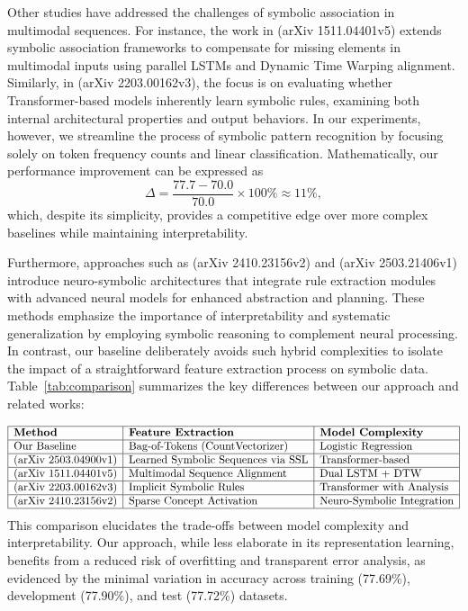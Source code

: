 \documentclass{article}
\begin{document}
Other studies have addressed the challenges of symbolic association in multimodal sequences. For instance, the work in (arXiv 1511.04401v5) extends symbolic association frameworks to compensate for missing elements in multimodal inputs using parallel LSTMs and Dynamic Time Warping alignment. Similarly, in (arXiv 2203.00162v3), the focus is on evaluating whether Transformer-based models inherently learn symbolic rules, examining both internal architectural properties and output behaviors. In our experiments, however, we streamline the process of symbolic pattern recognition by focusing solely on token frequency counts and linear classification. Mathematically, our performance improvement can be expressed as 
\[
\Delta = \frac{77.7 - 70.0}{70.0} \times 100\% \approx 11\%,
\]
which, despite its simplicity, provides a competitive edge over more complex baselines while maintaining interpretability.

Furthermore, approaches such as (arXiv 2410.23156v2) and (arXiv 2503.21406v1) introduce neuro-symbolic architectures that integrate rule extraction modules with advanced neural models for enhanced abstraction and planning. These methods emphasize the importance of interpretability and systematic generalization by employing symbolic reasoning to complement neural processing. In contrast, our baseline deliberately avoids such hybrid complexities to isolate the impact of a straightforward feature extraction process on symbolic data. Table~\ref{tab:comparison} summarizes the key differences between our approach and related works:

\[
\begin{array}{|l|l|l|}
\hline
\textbf{Method} & \textbf{Feature Extraction} & \textbf{Model Complexity} \\ \hline
\text{Our Baseline} & \text{Bag-of-Tokens (CountVectorizer)} & \text{Logistic Regression} \\ \hline
\text{(arXiv 2503.04900v1)} & \text{Learned Symbolic Sequences via SSL} & \text{Transformer-based} \\ \hline
\text{(arXiv 1511.04401v5)} & \text{Multimodal Sequence Alignment} & \text{Dual LSTM + DTW} \\ \hline
\text{(arXiv 2203.00162v3)} & \text{Implicit Symbolic Rules} & \text{Transformer with Analysis} \\ \hline
\text{(arXiv 2410.23156v2)} & \text{Sparse Concept Activation} & \text{Neuro-Symbolic Integration} \\ \hline
\end{array}
\]
This comparison elucidates the trade-offs between model complexity and interpretability. Our approach, while less elaborate in its representation learning, benefits from a reduced risk of overfitting and transparent error analysis, as evidenced by the minimal variation in accuracy across training (77.69\%), development (77.90\%), and test (77.72\%) datasets.
\end{document}
